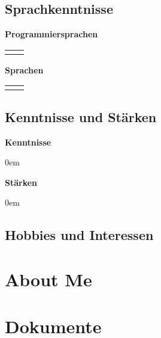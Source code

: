 \documentclass[
	a4paper,
	fontsize=12
]{scrartcl}
\begin{document}
\subsection{Sprachkenntnisse}
\begin{minipage}[t]{0.5\textwidth}
	\textbf{Programmiersprachen}\\\medskip
	\begin{tabularx}{\textwidth}{l!{\color{RoyalBlue}\vrule}X}
		\CVProgLangs
	\end{tabularx}
\end{minipage}
\begin{minipage}[t]{0.5\textwidth}
	\textbf{Sprachen}\\\medskip
	\begin{tabularx}{\textwidth}{l!{\color{RoyalBlue}\vrule}X}
		\CVNatLangs
	\end{tabularx}
\end{minipage}
\endgroup %

\subsection{Kenntnisse und Stärken}
\begin{minipage}[t]{0.5\textwidth}
	\textbf{Kenntnisse}	
	\begin{itemize}\itemsep0em
		\CVKnowledge
	\end{itemize}
\end{minipage}
\begin{minipage}[t]{0.5\textwidth}
	\textbf{Stärken}
	\begin{itemize}\itemsep0em 
		\CVStrength
	\end{itemize}
\end{minipage}
\subsection{Hobbies und Interessen}
	\CVHobbiesInterests
\newpage


\section{About Me}
\RecpSalutation
\bigskip

\CVAboutMe
\newpage


\section{Dokumente}

\newcommand{\RemainingPageHeight}{\dimexpr\pagegoal-\pagetotal-\baselineskip\relax}
\end{document}
